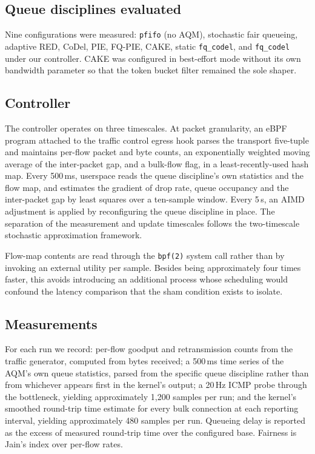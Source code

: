 \subsection*{Queue disciplines evaluated}

Nine configurations were measured: \texttt{pfifo} (no AQM), stochastic fair
queueing, adaptive RED\cite{red1993,ared2001}, CoDel\cite{rfc8289},
PIE\cite{rfc8033}, FQ-PIE\cite{fqpie2019}, CAKE\cite{cake2018}, static
\texttt{fq\_codel}\cite{rfc8290}, and \texttt{fq\_codel} under our controller.
CAKE was configured in best-effort mode without its own bandwidth parameter so
that the token bucket filter remained the sole shaper.

\subsection*{Controller}

The controller operates on three timescales. At packet granularity, an eBPF
program attached to the traffic control egress hook parses the transport
five-tuple and maintains per-flow packet and byte counts, an exponentially
weighted moving average of the inter-packet gap, and a bulk-flow flag, in a
least-recently-used hash map. Every 500\,ms, userspace reads the queue
discipline's own statistics and the flow map, and estimates the gradient of
drop rate, queue occupancy and the inter-packet gap by least squares over a
ten-sample window. Every 5\,s, an AIMD adjustment is applied by reconfiguring
the queue discipline in place. The separation of the measurement and update
timescales follows the two-timescale stochastic approximation
framework\cite{borkar1997}.

Flow-map contents are read through the \texttt{bpf(2)} system call rather than
by invoking an external utility per sample. Besides being approximately four
times faster, this avoids introducing an additional process whose scheduling
would confound the latency comparison that the sham condition exists to isolate.

\subsection*{Measurements}

For each run we record: per-flow goodput and retransmission counts from the
traffic generator, computed from bytes received; a 500\,ms time series of the
AQM's own queue statistics, parsed from the specific queue discipline rather
than from whichever appears first in the kernel's output; a 20\,Hz ICMP probe
through the bottleneck, yielding approximately 1{,}200 samples per run; and the
kernel's smoothed round-trip time estimate for every bulk connection at each
reporting interval, yielding approximately 480 samples per run. Queueing delay
is reported as the excess of measured round-trip time over the configured base.
Fairness is Jain's index\cite{jain1984} over per-flow rates.

